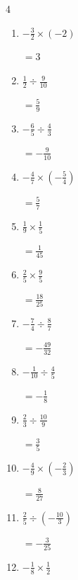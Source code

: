\begin{multicols}{4}
\begin{enumerate}
        $\displaystyle =-\frac{1}{4}$

  \item $\displaystyle -\frac{3}{2}\times{}\left(-2\right)$

        $\displaystyle =3$

  \item $\displaystyle \frac{1}{2}\div{}\frac{9}{10}$

        $\displaystyle =\frac{5}{9}$

  \item $\displaystyle -\frac{6}{5}\div{}\frac{4}{3}$

        $\displaystyle =-\frac{9}{10}$

  \item $\displaystyle -\frac{4}{7}\times{}\left(-\frac{5}{4}\right)$

        $\displaystyle =\frac{5}{7}$

  \item $\displaystyle \frac{1}{9}\times{}\frac{1}{5}$

        $\displaystyle =\frac{1}{45}$

  \item $\displaystyle \frac{2}{5}\times{}\frac{9}{5}$

        $\displaystyle =\frac{18}{25}$

  \item $\displaystyle -\frac{7}{4}\div{}\frac{8}{7}$

        $\displaystyle =-\frac{49}{32}$

  \item $\displaystyle -\frac{1}{10}\div{}\frac{4}{5}$

        $\displaystyle =-\frac{1}{8}$

  \item $\displaystyle \frac{2}{3}\div{}\frac{10}{9}$

        $\displaystyle =\frac{3}{5}$

\columnbreak %

  \item $\displaystyle -\frac{4}{9}\times{}\left(-\frac{2}{3}\right)$

        $\displaystyle =\frac{8}{27}$

  \item $\displaystyle \frac{2}{5}\div{}\left(-\frac{10}{3}\right)$

        $\displaystyle =-\frac{3}{25}$

  \item $\displaystyle -\frac{1}{8}\times{}\frac{1}{2}$


\end{enumerate}
\end{multicols}
